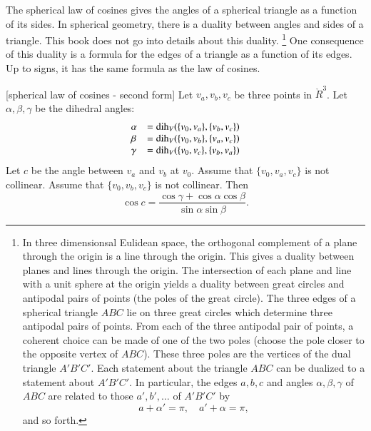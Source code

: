 The spherical law of cosines gives the angles of a spherical
triangle as a function of its sides.  In spherical geometry,
there is a duality between angles and sides of a triangle.
This book does not go into details about this duality.%
\footnote{In three dimensionsal Eulidean space, the orthogonal
complement of a plane through the origin is a line through
the origin.  This gives a duality between planes and lines
through the origin.  The intersection of each plane and line with
a unit sphere at the origin yields a duality between great
circles and antipodal
pairs of points (the poles of the great circle).  The three edges
of a spherical triangle $ABC$ lie on three great circles which
determine three
antipodal pairs of points.  From each of the three antipodal pair of points, 
a coherent
choice can be made of one of the two poles (choose the pole
closer to the opposite vertex of $ABC$).  
These three poles are the vertices
of the dual triangle $A'B'C'$.  Each statement about the triangle $ABC$
can be dualized to a statement about $A'B'C'$.
In particular, the edges $a,b,c$ and angles $\alpha,\beta,\gamma$ of $ABC$ 
are related to those $a',b',\ldots$ of $A'B'C'$ by
   $$
   a + \alpha' = \pi,\quad a' + \alpha= \pi,
   $$
and so forth.
}  
One
consequence of this duality is a formula for the edges of
a triangle as a function of its edges.  Up to signs,
it has the same formula as the law of cosines.

\begin{lemma}[spherical law of cosines - second form]
Let $v_a,v_b,v_c$ be three points in $\ring{R}^3$.
Let $\alpha,\beta,\gamma$ be the dihedral angles: 
   $$
   \begin{array}{lll}
     \alpha &= \operatorname{dih}_V(\{v_0,v_a\},\{v_b,v_c\})\\
     \beta &= \operatorname{dih}_V(\{v_0,v_b\},\{v_a,v_c\})\\
     \gamma&= \operatorname{dih}_V(\{v_0,v_c\},\{v_b,v_a\})\\
     \end{array}
   $$
Let $c$ be the
angle between $v_a$ and $v_b$ at $v_0$. 
Assume that $\{v_0,v_a,v_c\}$ is not
collinear. Assume that $\{v_0,v_b,v_c\}$ is not collinear.
Then
    $$
    \cos c = \frac{\cos \gamma + \cos \alpha \cos \beta}
     {\sin \alpha\sin \beta}.
    $$
\end{lemma}

